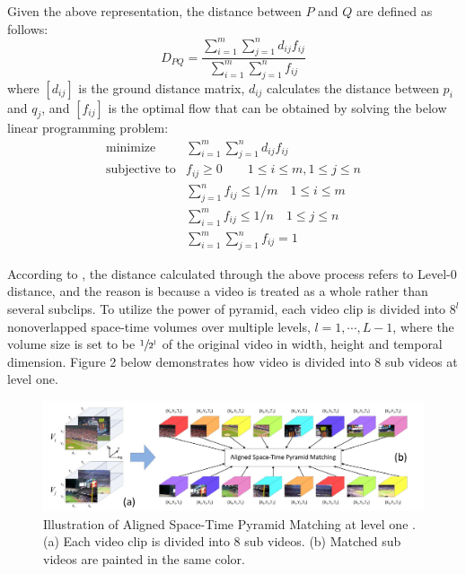 	\noindent Given the above representation, the distance between $P$ and $Q$ are defined as follows:
	\begin{equation}
	D_{PQ} = \frac{\sum_{i=1}^m \sum_{j=1}^n d_{ij} f_{ij}}{\sum_{i=1}^m\sum_{j=1}^n f_{ij}} 
	\end{equation}
	where $[d_{ij}]$ is the ground distance matrix, $d_{ij}$ calculates the distance between $p_i$ and $q_j$, and $[f_{ij}]$ is the optimal flow that can be obtained by solving the below linear programming problem:
	\begin{eqnarray}
	\text{minimize} & \sum_{i=1}^{m}\sum_{j=1}^{n}d_{ij}f_{ij} \nonumber \\
	\text{subjective to} & f_{ij} \geq 0 \quad \quad 1 \leq i \leq m,  1 \leq j \leq n \nonumber \\
	&\sum_{j=1}^n f_{ij} \leq 1 / m \quad 1 \leq i \leq m \nonumber \\
	&\sum_{i=1}^m f_{ij} \leq 1 / n \quad 1 \leq j \leq n\nonumber \\
	&\sum_{i=1}^{m} \sum_{j=1}^n f_{ij} = 1 
	\end{eqnarray}

	\noindent According to \cite{duan2012visual}, the distance calculated through the above process refers to Level-0 distance, and the reason is because a video is treated as a whole rather than several subclips. To utilize the power of pyramid, each video clip is divided into $8^l$ nonoverlapped space-time volumes over multiple levels, $l = 1,\cdots, L-1$, where the volume size is set to be $\sfrac{1}{2^l}$ of the original video in width, height and temporal dimension. Figure 2 below demonstrates how video is divided into 8 sub videos at level one. 

	\begin{figure}[!ht]
	\centering
		\includegraphics[width=1\linewidth]{./alignedST.png}
	\caption{Illustration of Aligned Space-Time Pyramid Matching at level one \cite{duan2012visual}. (a) Each video clip is divided into 8 sub videos. (b) Matched sub videos are painted in the same color.}
	\end{figure}

